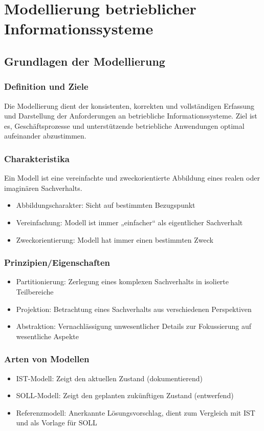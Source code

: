 \section{Modellierung betrieblicher Informationssysteme}

\subsection{Grundlagen der Modellierung}
    \subsubsection*{Definition und Ziele}
        Die Modellierung dient der konsistenten, korrekten und vollständigen Erfassung und Darstellung der Anforderungen an betriebliche Informationssysteme. Ziel ist es, Geschäftsprozesse und unterstützende betriebliche Anwendungen optimal aufeinander abzustimmen.
    \subsubsection*{Charakteristika}
        Ein Modell ist eine vereinfachte und zweckorientierte Abbildung eines realen oder imaginären Sachverhalts.
        \begin{itemize}
            \item Abbildungscharakter: Sicht auf bestimmten Bezugspunkt
            \item Vereinfachung: Modell ist immer „einfacher“ als eigentlicher Sachverhalt
            \item Zweckorientierung: Modell hat immer einen bestimmten Zweck
        \end{itemize}
    \subsubsection*{Prinzipien/Eigenschaften}
        \begin{itemize}
            \item Partitionierung: Zerlegung eines komplexen Sachverhalts in isolierte Teilbereiche
            \item Projektion: Betrachtung eines Sachverhalts aus verschiedenen Perspektiven
            \item Abstraktion: Vernachlässigung unwesentlicher Details zur Fokussierung auf wesentliche Aspekte
        \end{itemize}
    \subsubsection*{Arten von Modellen}
        \begin{itemize}
            \item IST-Modell: Zeigt den aktuellen Zustand (dokumentierend)
            \item SOLL-Modell: Zeigt den geplanten zukünftigen Zustand (entwerfend)
            \item Referenzmodell: Anerkannte Lösungsvorschlag, dient zum Vergleich mit IST und als Vorlage für SOLL
        \end{itemize}

